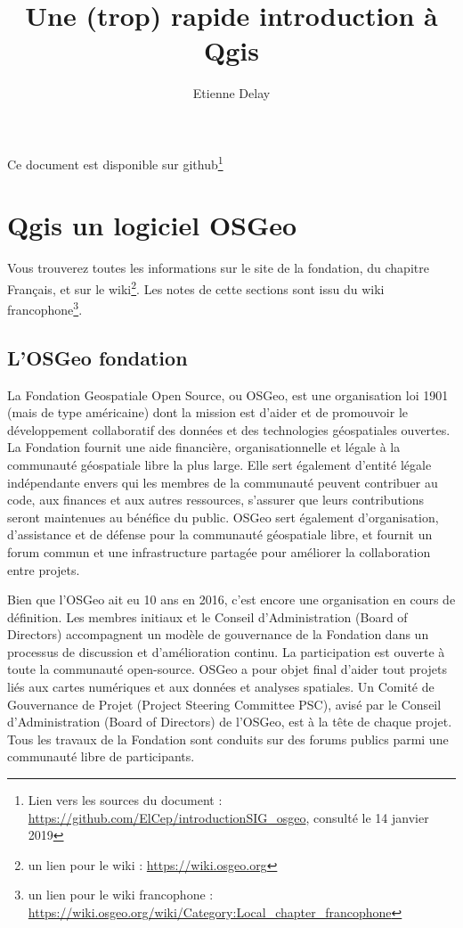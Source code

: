 \documentclass[a4paper, 11pt]{article}
\title{Une (trop) rapide introduction à Qgis}
\author[123]{Etienne Delay}
\affil[1]{1 CIRAD UPR GREEN, F-34398 Montpellier, France}
\affil[2]{GREEN, CIRAD, Univ. Montpellier, Montpellier France}
\affil[3]{Laboratoire GEOLAB UMR 6042 CNRS, Universit\'e de Limoges, FLSH. 39E rue Camille Gu\'erin, 87036 Limoges, France}
\begin{document}
\maketitle
Ce document est disponible sur github\footnote{Lien vers les sources du document : \url{https://github.com/ElCep/introductionSIG_osgeo}, consulté le 14 janvier 2019}

\section{Qgis un logiciel OSGeo}
Vous trouverez toutes les informations sur le site de la fondation, du chapitre Français, et sur le wiki\footnote{un lien pour le wiki : \url{https://wiki.osgeo.org}}. Les notes de cette sections sont issu du wiki francophone\footnote{un lien pour le wiki francophone : \url{https://wiki.osgeo.org/wiki/Category:Local\_chapter\_francophone}}.

  \subsection{L'OSGeo fondation}
  La Fondation Geospatiale Open Source, ou OSGeo, est une organisation loi 1901 (mais de type américaine) dont la mission est d'aider et de promouvoir le développement collaboratif des données et des technologies géospatiales ouvertes. La Fondation fournit une aide financière, organisationnelle et légale à la communauté géospatiale libre la plus large. Elle sert également d'entité légale indépendante envers qui les membres de la communauté peuvent contribuer au code, aux finances et aux autres ressources, s'assurer que leurs contributions seront maintenues au bénéfice du public. OSGeo sert également d'organisation, d'assistance et de défense pour la communauté géospatiale libre, et fournit un forum commun et une infrastructure partagée pour améliorer la collaboration entre projets.

  Bien que l'OSGeo ait eu 10 ans en 2016, c'est encore une organisation en cours de définition. Les membres initiaux et le Conseil d'Administration (Board of Directors) accompagnent un modèle de gouvernance de la Fondation dans  un processus de discussion et d'amélioration continu. La participation est ouverte à toute la communauté open-source. OSGeo a pour objet final d'aider tout projets liés aux cartes numériques et aux données et analyses spatiales. Un Comité de Gouvernance de Projet (Project Steering Committee PSC), avisé par le Conseil d'Administration (Board of Directors) de l'OSGeo, est à la tête de chaque projet. Tous les travaux de la Fondation sont conduits sur des forums publics parmi une communauté libre de participants.
\end{document}

